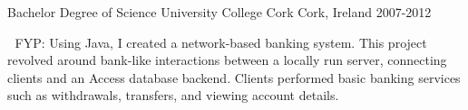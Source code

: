 


\begin{cventries}


\cventry
{Bachelor Degree of Science} %
{University College Cork} %
{Cork, Ireland} %
{2007-2012} %
{ %
\begin{cvitems}
\item {	FYP: Using Java, I created a network-based banking system. This project revolved around bank-like interactions between a locally run server, connecting clients and an Access database backend. Clients performed basic banking services such as withdrawals, transfers, and viewing account details.}
\end{cvitems}
}


\end{cventries}
